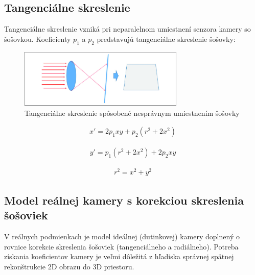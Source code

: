 \subsection{Tangenciálne skreslenie}

Tangenciálne skreslenie vzniká pri neparalelnom umiestnení senzora kamery so šošovkou. Koeficienty $p_1$ a $p_2$ predstavujú tangenciálne skreslenie šošovky:

\begin{figure}[h]
	\centering
	\includegraphics[width=0.7\textwidth]{figures/tangential_distortion.png} 
	\caption{Tangenciálne skreslenie spôsobené nesprávnym umiestnením šošovky}
	\label{fig:tangential_distortion}
\end{figure}

\begin{equation}
\label{eq::tangential_dist::a}
\begin{aligned}
x'= 2p_{1}xy + p_{2}\left(r^{2} + 2x^{2}\right)
\end{aligned}
\end{equation}

\begin{equation}
\label{eq::tangential_dist::b}
\begin{aligned}
y'= p_{1}\left(r^{2} + 2x^{2}\right) + 2p_{2}xy
\end{aligned}
\end{equation}

\begin{equation}
\label{eq::tangential_dist::c}
\begin{aligned}
r^2=x^2+y^2
\end{aligned}
\end{equation}

\subsection{Model reálnej kamery s korekciou skreslenia šošoviek}

V reálnych podmienkach je model ideálnej (dutinkovej) kamery doplnený o rovnice korekcie skreslenia šošoviek (tangenciálneho a radiálneho). Potreba získania koeficientov kamery je veľmi dôležitá z hľadiska správnej spätnej rekonštrukcie 2D obrazu do 3D priestoru.

